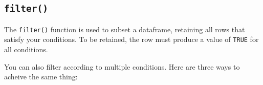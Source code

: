\documentclass[]{book}
\newenvironment{Shaded}{\begin{snugshade}}{\end{snugshade}}
\newcommand{\DecValTok}[1]{\textcolor[rgb]{0.00,0.00,0.81}{#1}}
\newcommand{\KeywordTok}[1]{\textcolor[rgb]{0.13,0.29,0.53}{\textbf{#1}}}
\newcommand{\NormalTok}[1]{#1}
\newcommand{\OperatorTok}[1]{\textcolor[rgb]{0.81,0.36,0.00}{\textbf{#1}}}
\newcommand{\StringTok}[1]{\textcolor[rgb]{0.31,0.60,0.02}{#1}}
\begin{document}
\hypertarget{filter}{%
\subsection*{\texorpdfstring{\texttt{filter()}}{filter()}}\label{filter}}

The \texttt{filter()} function is used to subset a dataframe, retaining all rows that satisfy your conditions. To be retained, the row must produce a value of \texttt{TRUE} for all conditions.

\begin{Shaded}
\end{Shaded}

\begin{Shaded}
\end{Shaded}

You can also filter according to multiple conditions. Here are three ways to acheive the same thing:

\begin{Shaded}
\end{Shaded}

\begin{Shaded}
\end{Shaded}
\end{document}
